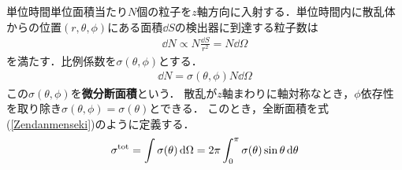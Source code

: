 \documentclass{report}
\begin{document}
単位時間単位面積当たり$N$個の粒子を$z$軸方向に入射する．単位時間内に散乱体からの位置$(r,\theta,\phi)$にある面積$\dd{S}$の検出器に到達する粒子数は
\begin{align}
  \dd{N} \propto N \frac{\dd{S}}{r^2} = N\dd{\Omega}
\end{align}
を満たす．比例係数を$\sigma (\theta, \phi)$とする．
\begin{align}
  \dd{N} = \sigma(\theta, \phi) N \dd{\Omega}
\end{align}
この$\sigma(\theta ,\phi)$を\textbf{微分断面積}という．
散乱が$z$軸まわりに軸対称なとき，$\phi$依存性を取り除き$\sigma(\theta, \phi) = \sigma (\theta)$とできる．
このとき，全断面積を式(\ref{Zendanmenseki})のように定義する．
\begin{align}
  \sigma^{\mathrm{tot}} = \int \sigma(\theta) \dd{\Omega} = 2\pi \int_{0}^{\pi} \sigma(\theta) \sin \theta \dd{\theta}
\end{align}
\end{document}

